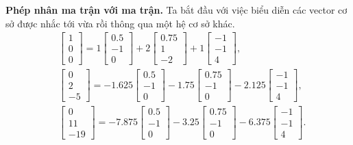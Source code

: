 \textbf{Phép nhân ma trận với ma trận.} Ta bắt đầu với việc biểu diễn các vector cơ sở được nhắc tới vừa rồi thông qua một hệ cơ sở khác.
\begin{align*}&\begin{bmatrix}
    1\\0\\0
\end{bmatrix}=1\begin{bmatrix}
    0.5 \\-1\\0
\end{bmatrix}+2\begin{bmatrix}
    0.75 \\1\\-2
\end{bmatrix}+1\begin{bmatrix}
    -1 \\-1\\4
\end{bmatrix},\\
&\begin{bmatrix}
    0\\2\\-5
\end{bmatrix}=-1.625\begin{bmatrix}
    0.5\\-1\\0
\end{bmatrix}-1.75\begin{bmatrix}
    0.75\\-1\\0
\end{bmatrix}-2.125\begin{bmatrix}
    -1\\-1\\4
\end{bmatrix},\\
&\begin{bmatrix}
    0\\11\\-19
\end{bmatrix}=-7.875\begin{bmatrix}
    0.5\\-1\\0
\end{bmatrix}-3.25\begin{bmatrix}
    0.75\\-1\\0
\end{bmatrix}-6.375\begin{bmatrix}
    -1\\-1\\4
\end{bmatrix}.
\end{align*}
